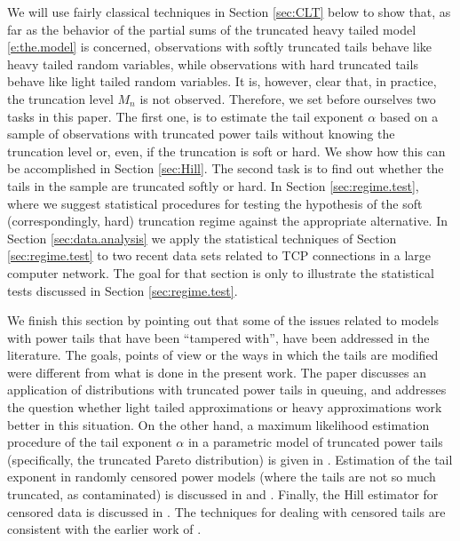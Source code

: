 \documentclass[11pt]{amsart}
\numberwithin{equation}{section}
\begin{document}
We will use fairly
classical techniques in Section \ref{sec:CLT} below to show that,
as far as the behavior of the partial sums of the truncated heavy
tailed model \eqref{e:the.model} is concerned, observations with
softly truncated tails behave like heavy tailed random variables,
while observations with hard truncated tails behave like light
tailed random variables. It is, however, clear that, in practice,
the truncation level $M_n$ is not observed. Therefore, we set
before ourselves two tasks in this paper. The first one, is to
estimate the tail exponent $\alpha$ based on a sample of
observations with truncated power tails without knowing the
truncation level or, even, if the truncation is soft or hard. We
show how this can be accomplished in Section \ref{sec:Hill}. The
second task is to find out whether the tails in the sample are
truncated softly or hard. In Section \ref{sec:regime.test}, where
we suggest statistical procedures for testing the hypothesis of
the soft (correspondingly, hard) truncation regime against the
appropriate alternative. In Section \ref{sec:data.analysis} we
apply the statistical techniques of Section \ref{sec:regime.test}
to two recent data sets related to TCP connections in a large
computer network. The goal for that section is only to illustrate the statistical tests discussed in Section \ref{sec:regime.test}.

We finish this section by pointing out that some of the issues
related to models with power tails that have been ``tampered with'', 
have been addressed in the literature. The goals, points of view or 
the ways in which the tails are modified were different from what is
done in the present work. The paper
\cite{asmussen:pihlsgard:2005} discusses an application of
distributions with truncated power tails in queuing, and addresses
the question whether light tailed approximations or heavy
approximations work better in this situation. On the other hand, a
maximum likelihood estimation procedure of the tail exponent
$\alpha$ in a parametric model of truncated power tails
(specifically, the truncated Pareto distribution) is given in
\cite{aban:meerschaert:panorska:2006}. Estimation of the
tail exponent in randomly censored power models (where the tails
are not so much truncated, as contaminated) is discussed in
\cite{beirlant:guillou:dierckx:fils-villetard:2007} and
\cite{einmahl:fils-villetard:guillou:2008}. Finally, the Hill
estimator for censored data is discussed in
\cite{beirlant:guillou:2001}. The techniques for dealing with censored
tails are consistent with the earlier work of
\cite{csorgo:horvath:mason:1986}.  
\end{document}
